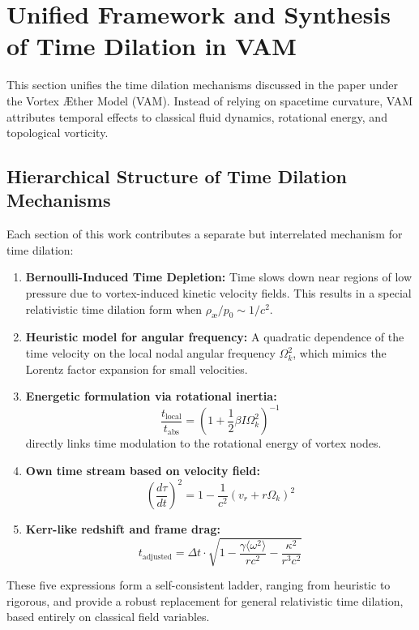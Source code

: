 \section{Unified Framework and Synthesis of Time Dilation in VAM}

This section unifies the time dilation mechanisms discussed in the paper under the Vortex Æther Model (VAM). Instead of relying on spacetime curvature, VAM attributes temporal effects to classical fluid dynamics, rotational energy, and topological vorticity.

\subsection{Hierarchical Structure of Time Dilation Mechanisms}

Each section of this work contributes a separate but interrelated mechanism for time dilation:

\begin{enumerate}
    \item \textbf{Bernoulli-Induced Time Depletion:} Time slows down near regions of low pressure due to vortex-induced kinetic velocity fields. This results in a special relativistic time dilation form when \( \rho_\text{\ae} / p_0 \sim 1/c^2 \).
    \item \textbf{Heuristic model for angular frequency:} A quadratic dependence of the time velocity on the local nodal angular frequency \( \Omega_k^2 \), which mimics the Lorentz factor expansion for small velocities.
    \item \textbf{Energetic formulation via rotational inertia:}
    \[
        \boxed{\frac{t_\text{local}}{t_\text{abs}} = \left(1 + \frac{1}{2} \beta I \Omega_k^2 \right)^{-1}}
    \]
    directly links time modulation to the rotational energy of vortex nodes. \item \textbf{Own time stream based on velocity field:}
    \[
        \boxed{\left( \frac{d\tau}{dt} \right)^2 = 1 - \frac{1}{c^2}(v_r + r\Omega_k)^2}
    \]
    \item \textbf{Kerr-like redshift and frame drag:}
    \[
        \boxed{t_\text{adjusted} = \Delta t \cdot \sqrt{1 - \frac{\gamma \langle \omega^2 \rangle}{rc^2} - \frac{\kappa^2}{r^3c^2}}}
    \]
\end{enumerate}

These five expressions form a self-consistent ladder, ranging from heuristic to rigorous, and provide a robust replacement for general relativistic time dilation, based entirely on classical field variables.

